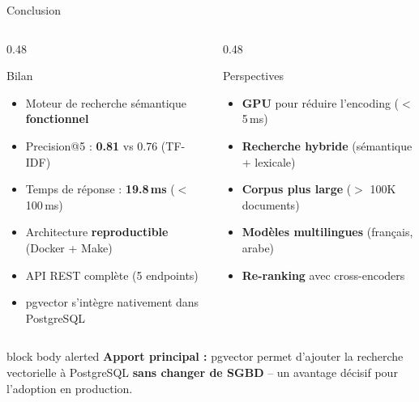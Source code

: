 \documentclass[aspectratio=169, 10pt]{beamer}
\begin{document}
\begin{frame}{Conclusion}
  \footnotesize
  \begin{columns}[T]
    \begin{column}{0.48\textwidth}
      \begin{block}{\textcolor{ASTRAwhite}{Bilan}}
        \begin{itemize}
          \setlength{\itemsep}{0.4em}
          \item Moteur de recherche s\'{e}mantique \textbf{fonctionnel}
          \item Precision@5 : \textbf{0.81} vs 0.76 (TF-IDF)
          \item Temps de r\'{e}ponse : \textbf{19.8\,ms} ($<$ 100\,ms)
          \item Architecture \textbf{reproductible} (Docker + Make)
          \item API REST compl\`{e}te (5 endpoints)
          \item pgvector s'int\`{e}gre nativement dans PostgreSQL
        \end{itemize}
      \end{block}
    \end{column}
    \begin{column}{0.48\textwidth}
      \begin{block}{\textcolor{ASTRAwhite}{Perspectives}}
        \begin{itemize}
          \setlength{\itemsep}{0.4em}
          \item \textbf{GPU} pour r\'{e}duire l'encoding ($<$ 5\,ms)
          \item \textbf{Recherche hybride} (s\'{e}mantique + lexicale)
          \item \textbf{Corpus plus large} ($>$ 100K documents)
          \item \textbf{Mod\`{e}les multilingues} (fran\c{c}ais, arabe)
          \item \textbf{Re-ranking} avec cross-encoders
        \end{itemize}
      \end{block}
    \end{column}
  \end{columns}

  \vspace{1em}
  \begin{beamercolorbox}[wd=\textwidth, rounded=true, sep=7pt]{block body alerted}
    \textbf{\textcolor{ASTRAnavy}{Apport principal :}}
    \textcolor{ASTRAnavy}{pgvector permet d'ajouter la recherche vectorielle \`{a} PostgreSQL \textbf{sans changer de SGBD} -- un avantage d\'{e}cisif pour l'adoption en production.}
  \end{beamercolorbox}
\end{frame}
\end{document}
